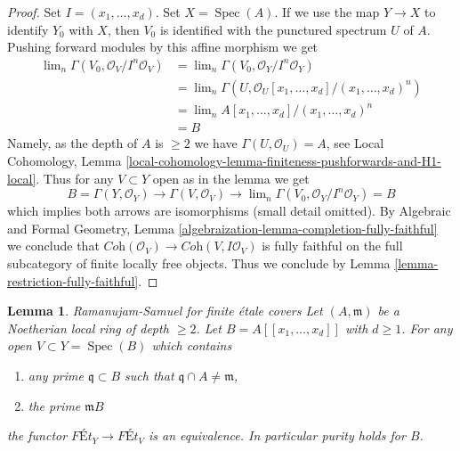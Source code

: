 \documentclass{stacks-project}
\newenvironment{slogan}{\comment}{\endcomment}
\theoremstyle{plain}
\newtheorem{lemma}[subsection]{Lemma}
\theoremstyle{definition}
\theoremstyle{remark}
\numberwithin{equation}{subsection}
\def\lim{\mathop{\mathrm{lim}}\nolimits}
\def\Spec{\mathop{\mathrm{Spec}}}
\begin{document}
\begin{proof}
Set $I = (x_1, \ldots, x_d)$. Set $X = \Spec(A)$.
If we use the map $Y \to X$ to identify $Y_0$ with $X$,
then $V_0$ is identified with the punctured spectrum $U$ of $A$.
Pushing forward modules by this affine morphism we get
\begin{align*}
\lim_n \Gamma(V_0, \mathcal{O}_V/I^n\mathcal{O}_V)
& =
\lim_n \Gamma(V_0, \mathcal{O}_Y/I^n\mathcal{O}_Y) \\
& =
\lim_n \Gamma(U, \mathcal{O}_U[x_1, \ldots, x_d]/(x_1, \ldots, x_d)^n) \\
& =
\lim_n A[x_1, \ldots, x_d]/(x_1, \ldots, x_d)^n \\
& =
B
\end{align*}
Namely, as the depth of $A$ is $\geq 2$ we have $\Gamma(U, \mathcal{O}_U) = A$,
see Local Cohomology, Lemma
\ref{local-cohomology-lemma-finiteness-pushforwards-and-H1-local}.
Thus for any $V \subset Y$ open as in the lemma we get
$$
B = \Gamma(Y, \mathcal{O}_Y) \to \Gamma(V, \mathcal{O}_V) \to
\lim_n \Gamma(V_0, \mathcal{O}_Y/I^n\mathcal{O}_Y) = B
$$
which implies both arrows are isomorphisms (small detail omitted).
By Algebraic and Formal Geometry, Lemma 
\ref{algebraization-lemma-completion-fully-faithful}
we conclude that
$\textit{Coh}(\mathcal{O}_V) \to \textit{Coh}(V, I\mathcal{O}_V)$
is fully faithful on the full subcategory of finite locally free objects.
Thus we conclude by
Lemma \ref{lemma-restriction-fully-faithful}.
\end{proof}

\begin{lemma}
\label{lemma-purity-power-series-over-depth2}
\begin{slogan}
Ramanujam-Samuel for finite \'etale covers
\end{slogan}
Let $(A, \mathfrak m)$ be a Noetherian local ring of depth $\geq 2$. Let
$B = A[[x_1, \ldots, x_d]]$ with $d \geq 1$. For any open
$V \subset Y = \Spec(B)$ which contains
\begin{enumerate}
\item any prime $\mathfrak q \subset B$ such that
$\mathfrak q \cap A \not = \mathfrak m$,
\item the prime $\mathfrak m B$
\end{enumerate}
the functor
$
\textit{F\'Et}_Y
\to
\textit{F\'Et}_V
$
is an equivalence. In particular purity holds for $B$.
\end{lemma}
\end{document}
